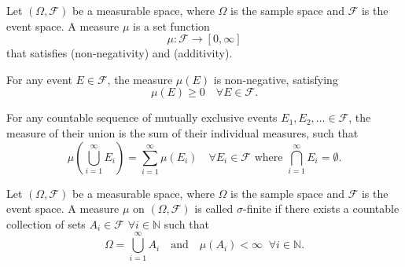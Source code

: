 \begin{definition}[Measure]
	\label{def:measure}
	Let $(\Omega, \mathcal{F})$ be a measurable space, where $\Omega$ is the sample space and $\mathcal{F}$ is the event space. A measure $\mu$ is a set function
	\begin{equation}
		\mu\colon \mathcal{F} \to [0,\infty]
	\end{equation}
	that satisfies  (non-negativity) and  (additivity).
\end{definition}

\begin{axiom}
	\label{ax:non_neg}
	For any event $E\in \mathcal{F}$, the measure $\mu(E)$ is non-negative, satisfying
	\begin{equation}
		\mu(E) \geq 0 \quad \forall E \in  \mathcal{F}.
	\end{equation}
\end{axiom}

\begin{axiom}[Additivity]
	\label{ax:add}
	For any countable sequence of mutually exclusive events $E_1, E_2, \ldots\in \mathcal{F}$, the measure of their union is the sum of their individual measures, such that
	\begin{equation}
		\mu\left(\bigcup_{i=1}^{\infty} \mathit{E}_i\right) = \sum_{i=1}^{\infty} \mu(\mathit{E}_i) \quad \forall \mathit{E}_i \in \mathcal{F} \text{ where } \bigcap_{i=1}^{\infty} \mathit{E}_i = \emptyset.
	\end{equation}
\end{axiom}

\begin{definition}
	\label{def:sigma_finite_measure}
	Let $(\Omega, \mathcal{F})$ be a measurable space, where $\Omega$ is the sample space and $\mathcal{F}$ is the event space. A measure $\mu$ on $(\Omega, \mathcal{F})$ is called $\sigma$-finite if there exists a countable collection of sets $A_i \in \mathcal{F}$ $\forall i\in \mathbb{N}$ such that 
	\begin{equation}
		\Omega = \bigcup_{i=1}^\infty A_i
		\quad\text{and}\quad 
		\mu(A_i) < \infty \;\; \forall i\in\mathbb{N}.
	\end{equation}
\end{definition}

